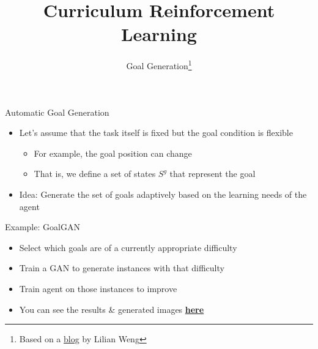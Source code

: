 


\title[Curriculum RL]{Curriculum Reinforcement Learning}
\subtitle{Goal Generation\footnote{Based on a \href{https://lilianweng.github.io/lil-log/2020/01/29/curriculum-for-reinforcement-learning.html}{blog} by Lilian Weng}}



	
	\maketitle

\begin{frame}[c]{Automatic Goal Generation}
	
	\begin{itemize}
		\item Let's assume that the task itself is fixed but the goal condition is flexible
		\begin{itemize}
			\item For example, the goal position can change
			\item That is, we define a set of states $S^g$ that represent the goal
		\end{itemize}
		\pause
		\smallskip
		\item \alert{Idea:} Generate the set of goals adaptively based on the learning needs of the agent
	\end{itemize}
	
\end{frame}
\begin{frame}[c]{Example: GoalGAN }
	
	\begin{itemize}
		\item Select which goals are of a currently appropriate difficulty
		\item Train a GAN to generate instances with that difficulty
		\item Train agent on those instances to improve
		\item You can see the results \& generated images \href{https://sites.google.com/view/goalgeneration4rl}{\textbf{here}}
	\end{itemize}
	
\end{frame}
